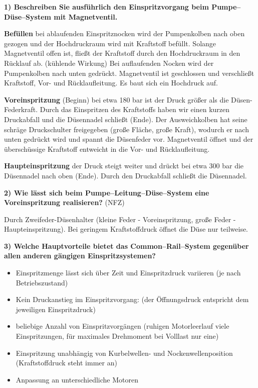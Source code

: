 \textbf{1) Beschreiben Sie ausführlich den Einspritzvorgang beim
Pumpe--Düse--System mit Magnetventil.}

\textbf{Befüllen} bei ablaufenden Einspritznocken wird der Pumpenkolben
nach oben gezogen und der Hochdruckraum wird mit Kraftstoff befüllt.
Solange Magnetventil offen ist, fließt der Kraftstoff durch den
Hochdruckraum in den Rücklauf ab. (kühlende Wirkung) Bei auflaufenden
Nocken wird der Pumpenkolben nach unten gedrückt. Magnetventil ist
geschlossen und verschließt Kraftstoff, Vor- und Rücklaufleitung. Es
baut sich ein Hochdruck auf.

\textbf{Voreinspritzung} (Beginn) bei etwa 180 bar ist der Druck größer
als die Düsen-Federkraft. Durch das Einspritzen des Kraftstoffs haben
wir einen kurzen Druckabfall und die Düsennadel schließt (Ende). Der
Ausweichkolben hat seine schräge Druckschulter freigegeben (große
Fläche, große Kraft), wodurch er nach unten gedrückt wird und spannt die
Düsenfeder vor. Magnetventil öffnet und der überschüssige Kraftstoff
entweicht in die Vor- und Rücklaufleitung.

\textbf{Haupteinspritzung} der Druck steigt weiter und drückt bei etwa
300 bar die Düsennadel nach oben (Ende). Durch den Druckabfall schließt
die Düsennadel.

\textbf{2) Wie lässt sich beim Pumpe--Leitung--Düse--System eine
Voreinspritzung realisieren?} (NFZ)

Durch Zweifeder-Düsenhalter (kleine Feder - Voreinspritzung, große Feder
- Haupteinspritzung). Bei geringem Kraftstoffdruck öffnet die Düse nur
teilweise.

\textbf{3) Welche Hauptvorteile bietet das Common--Rail--System
gegenüber allen anderen gängigen Einspritzsystemen?}

\begin{itemize}
\item
  Einspritzmenge lässt sich über Zeit und Einspritzdruck variieren (je
  nach Betriebszustand)
\item
  Kein Druckanstieg im Einspritzvorgang: (der Öffnungsdruck entspricht
  dem jeweiligen Einspritzdruck)
\item
  beliebige Anzahl von Einspritzvorgängen (ruhigen Motorleerlauf viele
  Einspritzungen, für maximales Drehmoment bei Volllast nur eine)
\item
  Einspritzung unabhängig von Kurbelwellen- und Nockenwellenposition
  (Kraftstoffdruck steht immer an)
\item
  Anpassung an unterschiedliche Motoren
\end{itemize}

